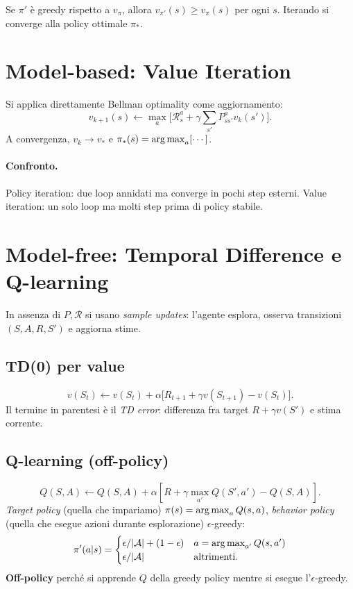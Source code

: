 \begin{theorem}
Se $\pi'$ è greedy rispetto a $v_\pi$, allora $v_{\pi'}(s) \geq v_\pi(s)$ per ogni $s$. Iterando si converge alla policy ottimale $\pi_*$.
\end{theorem}

\section{Model-based: Value Iteration}

Si applica direttamente Bellman optimality come aggiornamento:
\[
v_{k+1}(s) \leftarrow \max_a \Big[\mathcal{R}^a_s + \gamma \sum_{s'} P^a_{ss'} v_k(s')\Big].
\]
A convergenza, $v_k \to v_*$ e $\pi_*(s) = \operatorname*{arg\,max}_a [\cdots]$.

\paragraph{Confronto.} Policy iteration: due loop annidati ma converge in pochi step esterni. Value iteration: un solo loop ma molti step prima di policy stabile.

\section{Model-free: Temporal Difference e Q-learning}

In assenza di $P, \mathcal{R}$ si usano \emph{sample updates}: l'agente esplora, osserva transizioni $(S, A, R, S')$ e aggiorna stime.

\subsection{TD(0) per value}
\[
v(S_t) \leftarrow v(S_t) + \alpha \big[R_{t+1} + \gamma v(S_{t+1}) - v(S_t)\big].
\]
Il termine in parentesi è il \emph{TD error}: differenza fra target $R + \gamma v(S')$ e stima corrente.

\subsection{Q-learning (off-policy)}
\begin{equation}\label{eq:qlearning}
\boxed{\;Q(S, A) \leftarrow Q(S, A) + \alpha\!\left[R + \gamma \max_{a'} Q(S', a') - Q(S, A)\right].\;}
\end{equation}
\emph{Target policy} (quella che impariamo) $\pi(s) = \operatorname*{arg\,max}_a Q(s, a)$, \emph{behavior policy} (quella che esegue azioni durante esplorazione) $\epsilon$-greedy:
\[
\pi'(a|s) = \begin{cases} \epsilon/|\mathcal{A}| + (1-\epsilon) & a = \operatorname*{arg\,max}_{a'} Q(s,a')\\ \epsilon/|\mathcal{A}| & \text{altrimenti}.\end{cases}
\]
\textbf{Off-policy} perché si apprende $Q$ della greedy policy mentre si esegue l'$\epsilon$-greedy.

